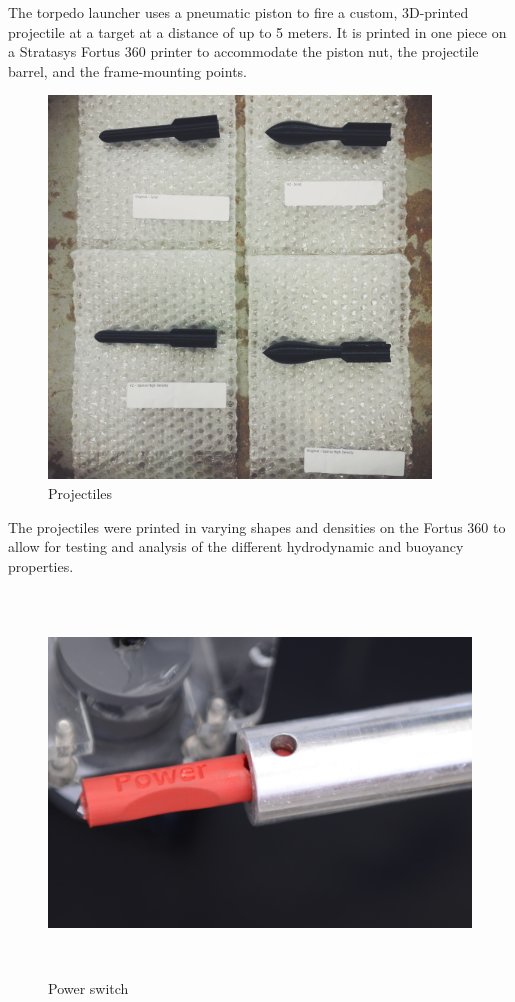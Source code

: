 \documentclass[12pt, landscape]{article}
\begin{document}
	The torpedo launcher uses a pneumatic piston to fire a custom, 3D-printed projectile at a target at a distance of up to 5 meters.  It is printed in one piece on a Stratasys Fortus 360 printer to accommodate the piston nut, the projectile barrel, and the frame-mounting points.

	\begin{figure}[H]
		\centering
		\includegraphics[height=4in]{media/torpedoes}
		\caption{Projectiles}
		\label{torpedo}
	\end{figure}

	The projectiles were printed in varying shapes and densities on the Fortus 360 to allow for testing and analysis of the different hydrodynamic and buoyancy properties.

	\begin{figure}[H]
		\centering
		\includegraphics[height=4in]{media/kill_switch}
		\caption{Power switch}
		\label{torpedo}
	\end{figure}
\end{document}
